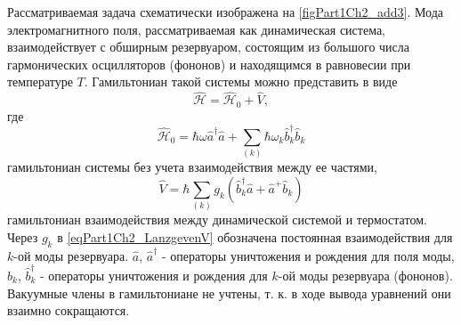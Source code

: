 Рассматриваемая задача схематически изображена на
\autoref{figPart1Ch2_add3}. Мода электромагнитного поля,
рассматриваемая как динамическая система, взаимодействует с обширным
резервуаром, состоящим из большого числа гармонических осцилляторов
(фононов) и находящимся в равновесии при температуре $T$. Гамильтониан
такой системы можно представить в виде
\begin{equation}
\hat{\mathcal{H}} = \hat{\mathcal{H}}_0 + \hat{V},
\nonumber
\end{equation}
где
\begin{equation}
 \hat{\mathcal{H}}_0 = \hbar\omega \hat{a}^{\dag}\hat{a} +
\sum_{(k)} \hbar\omega_k \hat{b}_k^{\dag} \hat{b}_k
\nonumber
\end{equation}
гамильтониан системы без учета взаимодействия между ее частями,
\begin{equation}
 \hat{V} = \hbar \sum_{(k)}g_k\left(
\hat{b}_k^{\dag}\hat{a} + \hat{a}^{+}\hat{b}_k
\right)
\label{eqPart1Ch2_LanzgevenV}
\end{equation}
гамильтониан взаимодействия между динамической системой и
термостатом. Через $g_k$ в \eqref{eqPart1Ch2_LanzgevenV} обозначена
постоянная взаимодействия для $k$-ой моды резервуара. $\hat{a}$,
$\hat{a}^{\dag}$ - операторы уничтожения и рождения для поля моды,
$\hat{b}_k$, $\hat{b}_{k}^{\dag}$ - операторы уничтожения и рождения для
$k$-ой моды резервуара (фононов). Вакуумные члены в гамильтониане не
учтены, т. к. в ходе вывода уравнений они взаимно сокращаются.

